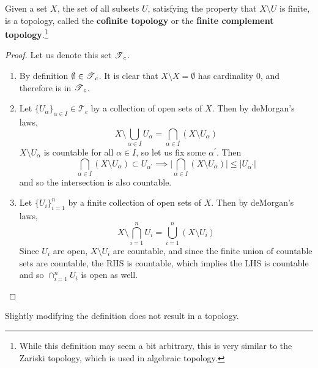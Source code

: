     \begin{theorem}
      Given a set $X$, the set of all subsets $U$, satisfying the property that $X \setminus U$ is finite, is a topology, called the \textbf{cofinite topology} or the \textbf{finite complement topology}.\footnote{While this definition may seem a bit arbitrary, this is very similar to the Zariski topology, which is used in algebraic topology.} 
    \end{theorem}
    \begin{proof}
      Let us denote this set $\T_c$. 
      \begin{enumerate}
        \item By definition $\emptyset \in \T_c$. It is clear that $X \setminus X = \emptyset$ has cardinality $0$, and therefore is in $\T_c$. 

        \item Let $\{U_\alpha\}_{\alpha \in I} \in \mathcal{T}_c$ by a collection of open sets of $X$. Then by deMorgan's laws, 
        \begin{equation}
          X \setminus \bigcup_{\alpha \in I} U_{\alpha} = \bigcap_{\alpha \in I} (X \setminus U_\alpha)
        \end{equation}
        $X \setminus U_\alpha$ is countable for all $\alpha \in I$, so let us fix some $\alpha^\prime$. Then 
        \begin{equation}
          \bigcap_{\alpha \in I} (X \setminus U_\alpha) \subset U_{\alpha^\prime} \implies \bigg| \bigcap_{\alpha \in I} (X \setminus U_\alpha) \bigg| \leq \big| U_{\alpha^\prime} \big| 
        \end{equation}
        and so the intersection is also countable. 

        \item Let $\{U_i\}_{i=1}^n$ by a finite collection of open sets of $X$. Then by deMorgan's laws, 
        \begin{equation}
          X \setminus \bigcap_{i=1}^n U_i = \bigcup_{i=1}^n (X \setminus U_i)
        \end{equation}
        Since $U_i$ are open, $X \setminus U_i$ are countable, and since the finite union of countable sets are countable, the RHS is countable, which implies the LHS is countable and so $\cap_{i=1}^n U_i$ is open as well. 
      \end{enumerate}
    \end{proof} 

    Slightly modifying the definition does not result in a topology. 

